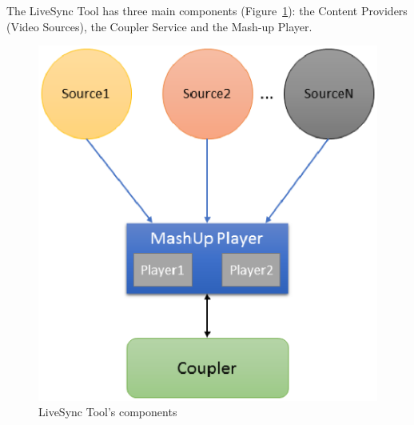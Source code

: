 The LiveSync Tool has three main components (Figure~\ref{livesync}): the Content Providers (Video Sources), the Coupler Service and the Mash-up Player.

\begin{figure}[ht!]
	\centerline{\includegraphics[scale=0.6] {figures/architecture}}
	\caption{LiveSync Tool's components}
	\label{livesync}
\end{figure}